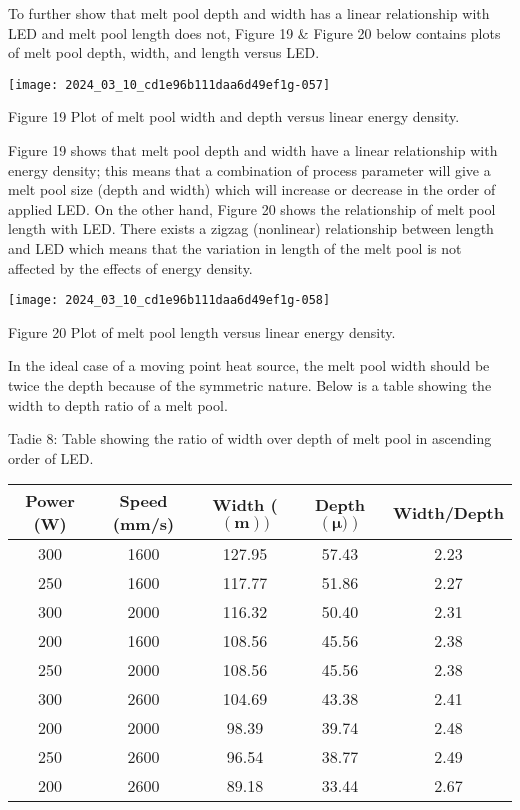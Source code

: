 \documentclass[10pt]{article}
\begin{document}
To further show that melt pool depth and width has a linear relationship with LED and melt pool length does not, Figure 19 \& Figure 20 below contains plots of melt pool depth, width, and length versus LED.

\begin{center}
\texttt{[image: 2024\_03\_10\_cd1e96b111daa6d49ef1g-057]}
\end{center}

Figure 19 Plot of melt pool width and depth versus linear energy density.

Figure 19 shows that melt pool depth and width have a linear relationship with energy density; this means that a combination of process parameter will give a melt pool size (depth and width) which will increase or decrease in the order of applied LED. On the other hand, Figure 20 shows the relationship of melt pool length with LED. There exists a zigzag (nonlinear) relationship between length and LED which means that the variation in length of the melt pool is not affected by the effects of energy density.

\begin{center}
\texttt{[image: 2024\_03\_10\_cd1e96b111daa6d49ef1g-058]}
\end{center}

Figure 20 Plot of melt pool length versus linear energy density.

In the ideal case of a moving point heat source, the melt pool width should be twice the depth because of the symmetric nature. Below is a table showing the width to depth ratio of a melt pool.

Tadie 8: Table showing the ratio of width over depth of melt pool in ascending order of LED.

\begin{center}
\begin{tabular}{|c|c|c|c|c|}
\hline
Power (W) & Speed (mm/s) & Width ( $\mathbf{( m )})$ & Depth $(\boldsymbol{\mu} \mathbf{)})$ & Width/Depth \\
\hline
300 & 1600 & 127.95 & 57.43 & 2.23 \\
\hline
250 & 1600 & 117.77 & 51.86 & 2.27 \\
\hline
300 & 2000 & 116.32 & 50.40 & 2.31 \\
\hline
200 & 1600 & 108.56 & 45.56 & 2.38 \\
\hline
250 & 2000 & 108.56 & 45.56 & 2.38 \\
\hline
300 & 2600 & 104.69 & 43.38 & 2.41 \\
\hline
200 & 2000 & 98.39 & 39.74 & 2.48 \\
\hline
250 & 2600 & 96.54 & 38.77 & 2.49 \\
\hline
200 & 2600 & 89.18 & 33.44 & 2.67 \\
\hline
\end{tabular}
\end{center}
\end{document}
